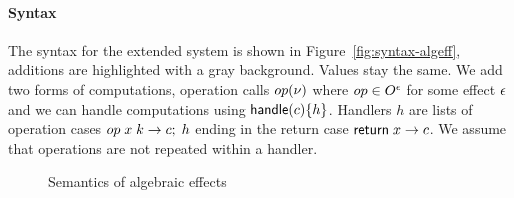 {\paragraph{Syntax}
The syntax for the extended system is shown in Figure~\ref{fig:syntax-algeff}, additions are highlighted with a gray background.
Values stay the same. We add two forms of computations, operation calls $op(\nu)$ where $op \in O^{\epsilon}$ for some effect $\epsilon$ and
we can handle computations using $\mathsf{handle} (c) \{ h \}$.
Handlers $h$ are lists of operation cases $op \; x \; k \rightarrow c ; \; h$ ending in the return case $\mathsf{return}\; x \rightarrow c$.
We assume that operations are not repeated within a handler.

\begin{figure}
\caption{Semantics of algebraic effects}
\centering
{}
\end{figure}

}

